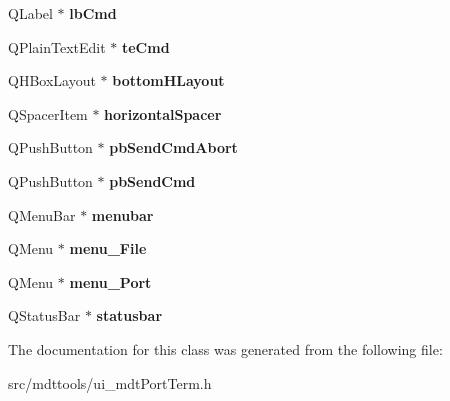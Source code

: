\begin{DoxyCompactItemize}
\item 
\hypertarget{class_ui__mdt_port_term_ab0b157b2e4d7916fdca147efb61616d5}{
QLabel $\ast$ {\bfseries lbCmd}}
\label{class_ui__mdt_port_term_ab0b157b2e4d7916fdca147efb61616d5}

\item 
\hypertarget{class_ui__mdt_port_term_a9eed8ef2bf0221b62534f96da1c4d69c}{
QPlainTextEdit $\ast$ {\bfseries teCmd}}
\label{class_ui__mdt_port_term_a9eed8ef2bf0221b62534f96da1c4d69c}

\item 
\hypertarget{class_ui__mdt_port_term_af2ab5c4257255b0714042684f5c47e51}{
QHBoxLayout $\ast$ {\bfseries bottomHLayout}}
\label{class_ui__mdt_port_term_af2ab5c4257255b0714042684f5c47e51}

\item 
\hypertarget{class_ui__mdt_port_term_a4f8aa13861383a54d08b9515f0427165}{
QSpacerItem $\ast$ {\bfseries horizontalSpacer}}
\label{class_ui__mdt_port_term_a4f8aa13861383a54d08b9515f0427165}

\item 
\hypertarget{class_ui__mdt_port_term_ae9022bd16347f0acd8b45c58a23a6d8c}{
QPushButton $\ast$ {\bfseries pbSendCmdAbort}}
\label{class_ui__mdt_port_term_ae9022bd16347f0acd8b45c58a23a6d8c}

\item 
\hypertarget{class_ui__mdt_port_term_a8b7643228cb46713f6ebaece2f0add1d}{
QPushButton $\ast$ {\bfseries pbSendCmd}}
\label{class_ui__mdt_port_term_a8b7643228cb46713f6ebaece2f0add1d}

\item 
\hypertarget{class_ui__mdt_port_term_a5419a1aeb22afed330b0b969a9aedd73}{
QMenuBar $\ast$ {\bfseries menubar}}
\label{class_ui__mdt_port_term_a5419a1aeb22afed330b0b969a9aedd73}

\item 
\hypertarget{class_ui__mdt_port_term_af4ff950d4030c0c2f203546caaa3a45f}{
QMenu $\ast$ {\bfseries menu\_\-File}}
\label{class_ui__mdt_port_term_af4ff950d4030c0c2f203546caaa3a45f}

\item 
\hypertarget{class_ui__mdt_port_term_a432f9e70278ef43133af282fba27092f}{
QMenu $\ast$ {\bfseries menu\_\-Port}}
\label{class_ui__mdt_port_term_a432f9e70278ef43133af282fba27092f}

\item 
\hypertarget{class_ui__mdt_port_term_ae922f4e6f3b8aa1db954038b8e335254}{
QStatusBar $\ast$ {\bfseries statusbar}}
\label{class_ui__mdt_port_term_ae922f4e6f3b8aa1db954038b8e335254}

\end{DoxyCompactItemize}


The documentation for this class was generated from the following file:\begin{DoxyCompactItemize}
\item 
src/mdttools/ui\_\-mdtPortTerm.h\end{DoxyCompactItemize}
